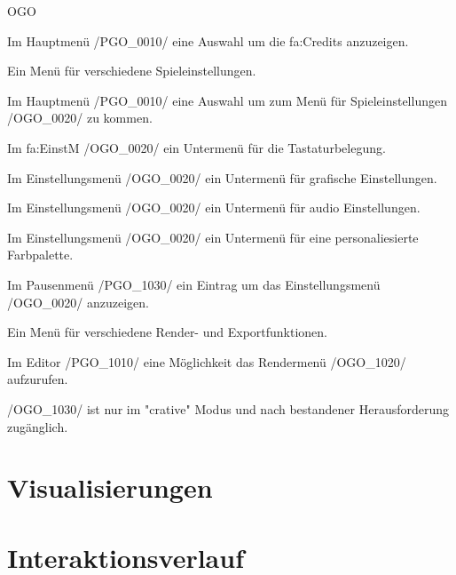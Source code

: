 \begin{ids}{\gls{OGO}}

	\id[0010] Im Hauptmenü /PGO\_0010/ eine Auswahl um die \gls{fa:Credits} anzuzeigen.
	
	\id[0020] Ein Menü für verschiedene Spieleinstellungen.
	
	\id[0030] Im Hauptmenü /PGO\_0010/ eine Auswahl um zum Menü für Spieleinstellungen /OGO\_0020/ zu kommen.
	
	\id[0040] Im \gls{fa:EinstM} /OGO\_0020/ ein Untermenü für die Tastaturbelegung.
	
	\id[0050] Im Einstellungsmenü /OGO\_0020/ ein Untermenü für grafische Einstellungen.
	
	\id[0060] Im Einstellungsmenü /OGO\_0020/ ein Untermenü für audio Einstellungen.
	
	\id[0070] Im Einstellungsmenü /OGO\_0020/ ein Untermenü für eine personaliesierte Farbpalette.
	
	\id[1010] Im Pausenmenü /PGO\_1030/ ein Eintrag um das Einstellungsmenü /OGO\_0020/ anzuzeigen.
	
	\id[1020] Ein Menü für verschiedene Render- und Exportfunktionen.
	
	\id[1030] Im Editor /PGO\_1010/ eine Möglichkeit das Rendermenü /OGO\_1020/ aufzurufen.
	
	\id[1040] /OGO\_1030/ ist nur im "crative" Modus und nach bestandener Herausforderung zugänglich.
	
\end{ids}



%
%
%
\clearpage



%
%
%



\section*{Visualisierungen}








\section{Interaktionsverlauf}

